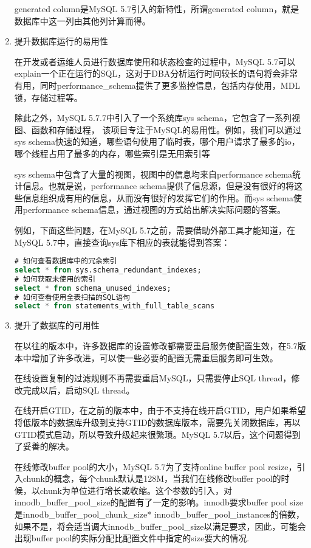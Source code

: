\begin{enumerate}
generated column是MySQL 5.7引入的新特性，所谓generated column，就是数据库中这一列由其他列计算而得。
\item 提升数据库运行的易用性

在开发或者运维人员进行数据库使用和状态检查的过程中，MySQL 5.7可以explain一个正在运行的SQL，这对于DBA分析运行时间较长的语句将会非常有用，同时performance\_schema提供了更多监控信息，包括内存使用，MDL锁，存储过程等。

除此之外，MySQL 5.7.7中引入了一个系统库sys schema，它包含了一系列视图、函数和存储过程， 该项目专注于MySQL的易用性。例如，我们可以通过sys schema快速的知道，哪些语句使用了临时表，哪个用户请求了最多的io，哪个线程占用了最多的内存，哪些索引是无用索引等

sys schema中包含了大量的视图，视图中的信息均来自performance schema统计信息。也就是说，performance schema提供了信息源，但是没有很好的将这些信息组织成有用的信息，从而没有很好的发挥它们的作用。而sys schema使用performance schema信息，通过视图的方式给出解决实际问题的答案。

例如，下面这些问题，在MySQL 5.7之前，需要借助外部工具才能知道，在MySQL 5.7中，直接查询sys库下相应的表就能得到答案：
\begin{lstlisting}[language=sql,numbers=none]
# 如何查看数据库中的冗余索引
select * from sys.schema_redundant_indexes;
# 如何获取未使用的索引
select * from schema_unused_indexes;
# 如何查看使用全表扫描的SQL语句
select * from statements_with_full_table_scans
\end{lstlisting}
\item 提升了数据库的可用性

在以往的版本中，许多数据库的设置修改都需要重启服务使配置生效，在5.7版本中增加了许多改进，可以使一些必要的配置无需重启服务即可生效。

在线设置复制的过滤规则不再需要重启MySQL，只需要停止SQL thread，修改完成以后，启动SQL thread。

在线开启GTID，在之前的版本中，由于不支持在线开启GTID，用户如果希望将低版本的数据库升级到支持GTID的数据库版本，需要先关闭数据库，再以GTID模式启动，所以导致升级起来很繁琐。MySQL 5.7以后，这个问题得到了妥善的解决。

在线修改buffer pool的大小，MySQL 5.7为了支持online buffer pool resize，引入chunk的概念，每个chunk默认是128M，当我们在线修改buffer pool的时候，以chunk为单位进行增长或收缩。这个参数的引入，对innodb\_buffer\_pool\_size的配置有了一定的影响。innodb要求buffer pool size是innodb\_buffer\_pool\_chunk\_size* innodb\_buffer\_pool\_instances的倍数，如果不是，将会适当调大innodb\_buffer\_pool\_size以满足要求，因此，可能会出现buffer pool的实际分配比配置文件中指定的size要大的情况.


\end{enumerate}

